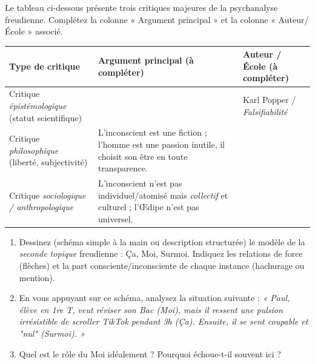 \documentclass[11pt]{article}
\newcommand{\cle}[1]{{\popxbold\color{popdark}#1}}
\newcounter{popsec}
\newcounter{popsub}
\newcommand{\courssub}[1]{%
  \stepcounter{popsub}%
  \par\vspace{9pt}\noindent{\popxbold\fontsize{11.5}{13}\selectfont\color{popink}{\color{poporange}\thepopsec.\thepopsub}\hspace{6pt}#1}\par\nopagebreak\vspace{4pt}
}
\begin{document}
\begin{exercice}
Le tableau ci-dessous présente trois critiques majeures de la psychanalyse freudienne. Complétez la colonne « Argument principal » et la colonne « Auteur/École » associé.

\begin{center}
\begin{tabularx}{\linewidth}{|l|X|X|}\hline
\textbf{Type de critique} & \textbf{Argument principal (à compléter)} & \textbf{Auteur / École (à compléter)} \\ \hline
Critique \emph{épistémologique} (statut scientifique) &  & Karl Popper / \emph{Falsifiabilité} \\ \hline
Critique \emph{philosophique} (liberté, subjectivité) & L'inconscient est une fiction ; l'homme est une passion inutile, il choisit son être en toute transparence. &  \\ \hline
Critique \emph{sociologique / anthropologique} & L'inconscient n'est pas individuel/atomisé mais \emph{collectif} et culturel ; l'Œdipe n'est pas universel. &  \\ \hline
\end{tabularx}
\end{center}
\end{exercice}

\begin{exercice}
\begin{enumerate}
    \item Dessinez (schéma simple à la main ou description structurée) le modèle de la \emph{seconde topique} freudienne : \cle{Ça}, \cle{Moi}, \cle{Surmoi}. Indiquez les relations de force (flèches) et la part consciente/inconsciente de chaque instance (hachurage ou mention).
    \item En vous appuyant sur ce schéma, analysez la situation suivante : \emph{« Paul, élève en 1re T, veut réviser son Bac (Moi), mais il ressent une pulsion irrésistible de scroller TikTok pendant 3h (Ça). Ensuite, il se sent coupable et "nul" (Surmoi). »}
    \item Quel est le rôle du \cle{Moi} idéalement ? Pourquoi échoue-t-il souvent ici ?
\end{enumerate}
\end{exercice}

\courssub{Je me prépare au Bac}
\end{document}
